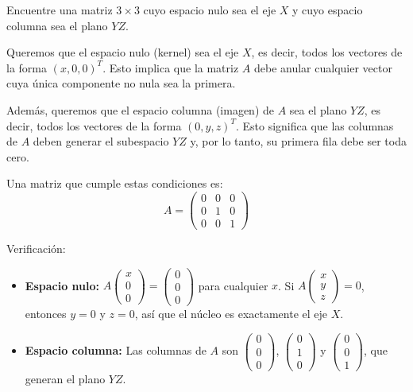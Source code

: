 \begin{prob}
Encuentre una matriz $3\times 3$ cuyo espacio nulo sea el eje $X$ y cuyo espacio columna sea el plano $YZ$.
\begin{myproof}
Queremos que el espacio nulo (kernel) sea el eje $X$, es decir, todos los vectores de la forma $(x,0,0)^T$. Esto implica que la matriz $A$ debe anular cualquier vector cuya única componente no nula sea la primera.

Además, queremos que el espacio columna (imagen) de $A$ sea el plano $YZ$, es decir, todos los vectores de la forma $(0, y, z)^T$. Esto significa que las columnas de $A$ deben generar el subespacio $YZ$ y, por lo tanto, su primera fila debe ser toda cero.

Una matriz que cumple estas condiciones es:
\[
A = \begin{pmatrix}
0 & 0 & 0 \\
0 & 1 & 0 \\
0 & 0 & 1
\end{pmatrix}
\]

Verificación:
\begin{itemize}
    \item \textbf{Espacio nulo:} $A\begin{pmatrix} x \\ 0 \\ 0 \end{pmatrix} = \begin{pmatrix} 0 \\ 0 \\ 0 \end{pmatrix}$ para cualquier $x$. Si $A\begin{pmatrix} x \\ y \\ z \end{pmatrix} = 0$, entonces $y = 0$ y $z = 0$, así que el núcleo es exactamente el eje $X$.
    \item \textbf{Espacio columna:} Las columnas de $A$ son $\begin{pmatrix} 0 \\ 0 \\ 0 \end{pmatrix}$, $\begin{pmatrix} 0 \\ 1 \\ 0 \end{pmatrix}$ y $\begin{pmatrix} 0 \\ 0 \\ 1 \end{pmatrix}$, que generan el plano $YZ$.
\end{itemize}
\end{myproof}
\end{prob}




